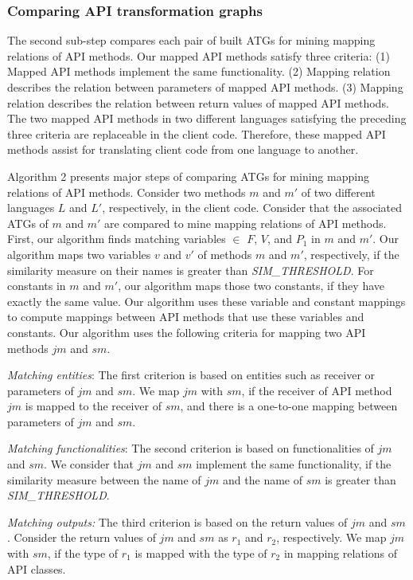 \subsubsection{Comparing API transformation graphs}

The second sub-step compares each pair of built ATGs for mining mapping
relations of API methods. Our mapped API methods satisfy three
criteria: (1) Mapped API methods implement the same
functionality. (2) Mapping relation describes the relation
between parameters of mapped API methods. (3) Mapping relation
describes the relation between return values of
mapped API methods. The two mapped API methods in two
different languages satisfying the preceding three criteria
are replaceable in the client code. Therefore, these mapped API
methods assist for translating client code from one language to another.

Algorithm 2 presents major steps of comparing ATGs for mining
mapping relations of API methods. Consider two methods $m$ and $m'$
of two different languages $L$ and $L'$, respectively, in the client
code. Consider that the associated ATGs of $m$ and $m'$ are compared
to mine mapping relations of API methods. First, our algorithm finds
matching variables $\in$ $F$, $V$, and $P_1$ in $m$ and $m'$. Our
algorithm maps two variables $v$ and $v'$ of methods $m$ and $m'$,
respectively, if the similarity measure on their names is greater
than \emph{SIM\_THRESHOLD}. For constants in $m$ and $m'$, our
algorithm maps those two constants, if they have exactly the same
value. Our algorithm uses these variable and constant mappings to
compute mappings between API methods that use these variables and
constants. Our algorithm uses the following criteria for mapping two
API methods $jm$ and $sm$.

\emph{Matching entities}: The first criterion is based on entities such as receiver 
or parameters of $jm$ and $sm$. We map $jm$ with $sm$, if
the receiver of API method $jm$ is mapped to the receiver 
of $sm$, and there is a one-to-one mapping between parameters
of $jm$ and $sm$.

\emph{Matching functionalities}: The second criterion is based on functionalities of
$jm$ and $sm$. We consider that $jm$ and $sm$ implement the same functionality,
if the similarity measure between the name of $jm$ and the name of $sm$ is
greater than \emph{SIM\_THRESHOLD}.

\emph{Matching outputs:} The third criterion is based on the return values of $jm$ and $sm$.
Consider the return values of $jm$ and $sm$ as $r_1$ and $r_2$, respectively. We map $jm$
with $sm$, if the type of $r_1$ is mapped with the type of $r_2$ in 
mapping relations of API classes.

